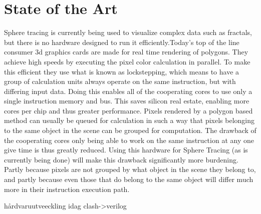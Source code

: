 \chapter{State of the Art}

Sphere tracing is currently being used to visualize complex data such as 
fractals, but there is no hardware designed to run it efficiently.Today's top 
of the line consumer 3d graphics cards are made for real time rendering of 
polygons. They achieve high speeds by executing the pixel color calculation in 
parallel. To make this efficient they use what is known as lockstepping, which 
means to have a group of calculation units always operate on the same 
instruction, but with differing input data. Doing this enables all of the 
cooperating cores to use only a single instruction memory and bus. This saves 
silicon real estate, enabling more cores per chip and thus greater performance. 
Pixels rendered by a polygon based method can usually be queued for calculation 
in such a way that pixels belonging to the same object in the scene can be 
grouped for computation. The drawback of the cooperating cores only being able 
to work on the same instruction at any one give time is thus greatly reduced. 
Using this hardware for Sphere Tracing (as is currently being done) will make 
this drawback significantly more burdening. Partly because pixels are not 
grouped by what object in the scene they belong to, and partly because even 
those that do belong to the same object will differ much more in their 
instruction execution path.




hårdvaruutveeckling idag
clash->verilog
